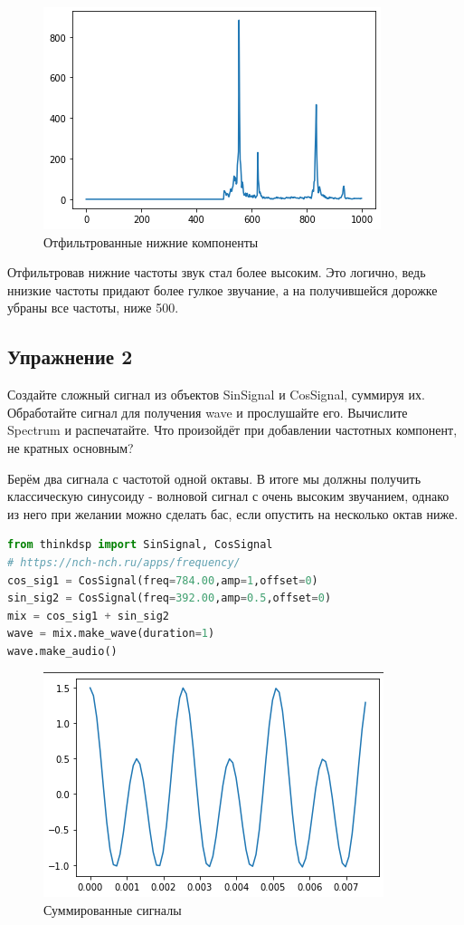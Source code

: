 \begin{figure}[H]
	\begin{center}
		\includegraphics[scale=1]{fig/lab01/lab1_7.png}
		\caption{Отфильтрованные нижние компоненты}
	\end{center}
\end{figure}

Отфильтровав нижние частоты звук стал более высоким. Это логично, ведь ннизкие частоты придают более гулкое звучание, а на получившейся дорожке убраны все частоты, ниже 500.

\subsection{Упражнение 2}

Создайте сложный сигнал из объектов SinSignal и CosSignal, суммируя их. Обработайте сигнал для получения wave и прослушайте его. Вычислите Spectrum и распечатайте. Что произойдёт при добавлении частотных компонент, не кратных основным?


Берём два сигнала с частотой одной октавы. В итоге мы должны получить классическую синусоиду - волновой сигнал с очень высоким звучанием, однако из него при желании можно сделать бас, если опустить на несколько октав ниже.
\begin{lstlisting}[language=Python]
from thinkdsp import SinSignal, CosSignal
# https://nch-nch.ru/apps/frequency/
cos_sig1 = CosSignal(freq=784.00,amp=1,offset=0)
sin_sig2 = CosSignal(freq=392.00,amp=0.5,offset=0)
mix = cos_sig1 + sin_sig2
wave = mix.make_wave(duration=1)
wave.make_audio()
\end{lstlisting}

\begin{figure}[H]
	\begin{center}
		\includegraphics[scale=1]{fig/lab01/lab1_8.png}
		\caption{Суммированные сигналы}
	\end{center}
\end{figure}

